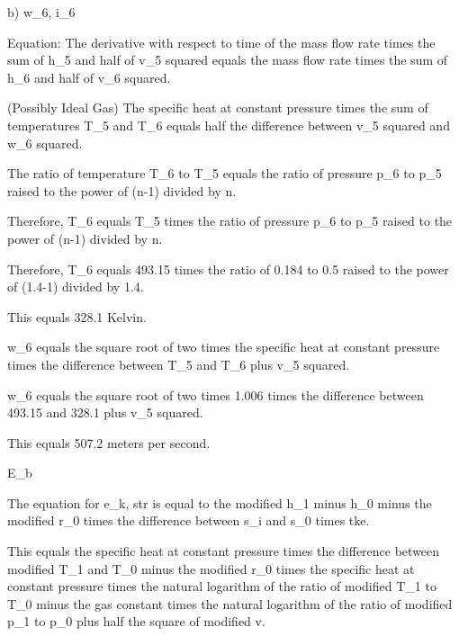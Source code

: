 b) w_6, i_6

Equation:
The derivative with respect to time of the mass flow rate times the sum of h_5 and half of v_5 squared equals the mass flow rate times the sum of h_6 and half of v_6 squared.

(Possibly Ideal Gas)
The specific heat at constant pressure times the sum of temperatures T_5 and T_6 equals half the difference between v_5 squared and w_6 squared.

The ratio of temperature T_6 to T_5 equals the ratio of pressure p_6 to p_5 raised to the power of (n-1) divided by n.

Therefore, T_6 equals T_5 times the ratio of pressure p_6 to p_5 raised to the power of (n-1) divided by n.

Therefore, T_6 equals 493.15 times the ratio of 0.184 to 0.5 raised to the power of (1.4-1) divided by 1.4.

This equals 328.1 Kelvin.

w_6 equals the square root of two times the specific heat at constant pressure times the difference between T_5 and T_6 plus v_5 squared.

w_6 equals the square root of two times 1.006 times the difference between 493.15 and 328.1 plus v_5 squared.

This equals 507.2 meters per second.

E_b

The equation for e_k, str is equal to the modified h_1 minus h_0 minus the modified r_0 times the difference between s_i and s_0 times tke.

This equals the specific heat at constant pressure times the difference between modified T_1 and T_0 minus the modified r_0 times the specific heat at constant pressure times the natural logarithm of the ratio of modified T_1 to T_0 minus the gas constant times the natural logarithm of the ratio of modified p_1 to p_0 plus half the square of modified v.